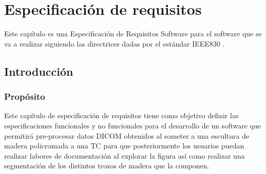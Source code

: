 \chapter{Especificación de requisitos}

Este capítulo es una Especificación de Requisitos Software para el software que se va a realizar siguiendo las directrices dadas por el estándar IEEE830 \cite{iee830}.

\section{Introducción}

\subsection{Propósito}

Este capítulo de especificación de requisitos tiene como objetivo definir las especificaciones funcionales y no funcionales para el desarrollo de un software que permitirá pre-procesar datos DICOM obtenidos al someter a una escultura de madera policromada a una TC para que posteriormente los usuarios puedan realizar labores de documentación al explorar la figura así como realizar una segmentación de los distintos trozos de madera que la componen. 